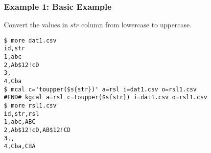 \subsubsection*{Example 1: Basic Example}

Convert the values in $str$ column from lowercase to uppercase.


\begin{Verbatim}[baselinestretch=0.7,frame=single]
$ more dat1.csv
id,str
1,abc
2,Ab$12!cD
3,
4,Cba
$ mcal c='toupper($s{str})' a=rsl i=dat1.csv o=rsl1.csv
#END# kgcal a=rsl c=toupper($s{str}) i=dat1.csv o=rsl1.csv
$ more rsl1.csv
id,str,rsl
1,abc,ABC
2,Ab$12!cD,AB$12!CD
3,,
4,Cba,CBA
\end{Verbatim}
